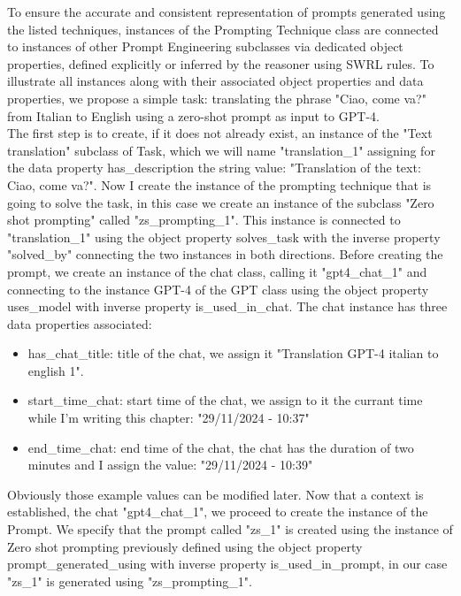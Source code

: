 To ensure the accurate and consistent representation of prompts generated using the listed techniques, instances of the Prompting Technique class are connected to instances of other Prompt Engineering subclasses via dedicated object properties, defined explicitly or inferred by the reasoner using SWRL rules.
To illustrate all instances along with their associated object properties and data properties, we propose a simple task: translating the phrase "Ciao, come va?" from Italian to English using a zero-shot prompt as input to GPT-4.\\
The first step is to create, if it does not already exist, an instance of the "Text translation" subclass of Task, which we will name "translation\_1" assigning for the data property has\_description the string value: "Translation of the text: Ciao, come va?".
Now I create the instance of the prompting technique that is going to solve the task, in this case we create an instance of the subclass "Zero shot prompting" called "zs\_prompting\_1".
This instance is connected to "translation\_1" using the object property solves\_task with the inverse property "solved\_by" connecting the two instances in both directions. Before creating the prompt, we create an instance of the chat class, calling it "gpt4\_chat\_1" and connecting to the instance GPT-4 of the GPT class using the object property uses\_model with inverse property is\_used\_in\_chat.
The chat instance has three data properties associated:
\begin{itemize}
    \item has\_chat\_title: title of the chat, we assign it "Translation GPT-4 italian to english 1".

    \item start\_time\_chat: start time of the chat, we assign to it the currant time while I'm writing this chapter: "29/11/2024 - 10:37"

    \item end\_time\_chat: end time of the chat, the chat has the duration of two minutes and I assign the value: "29/11/2024 - 10:39"
\end{itemize}
Obviously those example values can be modified later.
Now that a context is established, the chat "gpt4\_chat\_1", we proceed to create the instance of the Prompt.
We specify that the prompt called "zs\_1" is created using the instance of Zero shot prompting previously defined using the object property prompt\_generated\_using with inverse property is\_used\_in\_prompt, in our case "zs\_1" is generated using "zs\_prompting\_1".
